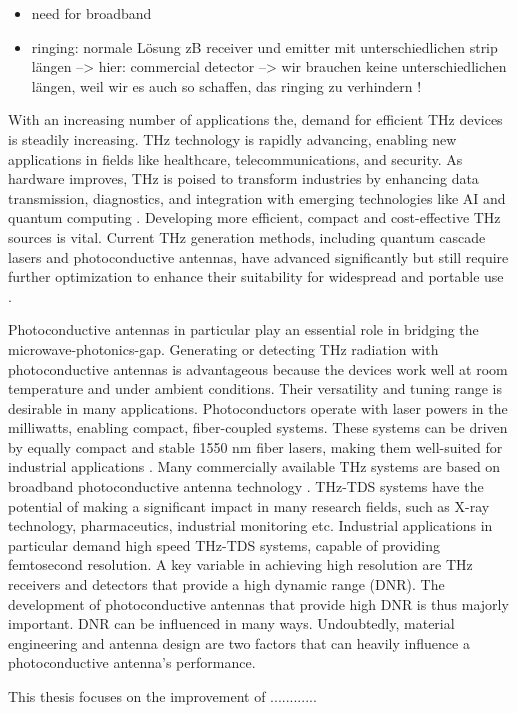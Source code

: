 \begin{itemize}
    \item need for broadband 
    \item ringing: normale Lösung zB receiver und emitter mit unterschiedlichen strip längen --> hier: commercial detector --> wir brauchen keine unterschiedlichen längen, weil wir es auch so schaffen, das ringing zu verhindern !
\end{itemize}

With an increasing number of applications the, demand for efficient THz devices is steadily increasing. THz technology is rapidly advancing, enabling new applications in fields like healthcare, telecommunications, and security. As hardware improves, THz is poised to transform industries by enhancing data transmission, diagnostics, and integration with emerging technologies like AI and quantum computing \cite{shekariApplicationsTerahertzTechnology2025}. Developing more efficient, compact and cost-effective THz sources is vital. Current THz generation methods, including quantum cascade lasers and photoconductive antennas, have advanced significantly but still require further optimization to enhance their suitability for widespread and portable use \cite{THzSecurityApplications}. 

Photoconductive antennas in particular play an essential role in bridging the microwave-photonics-gap. Generating or detecting THz radiation with photoconductive antennas is advantageous because the devices work well at room temperature and under ambient conditions. Their versatility and tuning range is desirable in many applications. Photoconductors operate with laser powers in the milliwatts, enabling compact, fiber-coupled systems. These systems can be driven by equally compact and stable \num{1550} \si{\nano \meter} fiber lasers, making them well-suited for industrial applications \cite{naftalyIndustrialApplicationsTerahertz2019}. Many commercially available THz systems are based on broadband photoconductive antenna technology \cite{burfordReviewTerahertzPhotoconductive2017}. THz-TDS systems have the potential of making a significant impact in many research fields, such as X-ray technology, pharmaceutics, industrial monitoring etc. Industrial applications in particular demand high speed THz-TDS systems, capable of providing femtosecond resolution. A key variable in achieving high resolution are THz receivers and detectors that provide a high dynamic range (DNR). The development of photoconductive antennas that provide high DNR is thus majorly important. DNR can be influenced in many ways. Undoubtedly, material engineering and antenna design are two factors that can heavily influence a photoconductive antenna's performance.  

This thesis focuses on the improvement of ............